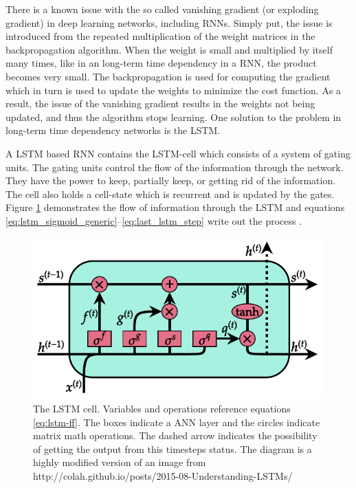 \documentclass[../main.tex]{subfiles}
\begin{document}
There is a known issue with the so called vanishing gradient (or exploding gradient) in deep learning networks, including \acp{RNN}.
Simply put, the issue is introduced from the repeated multiplication of the weight matrices in the backpropagation algorithm.
When the weight is small and multiplied by itself many times, like in an long-term time dependency in a \ac{RNN}, the product becomes very small.
The backpropagation is used for computing the gradient which in turn is used to update the weights to minimize the cost function.
As a result, the issue of the vanishing gradient results in the weights not being updated, and thus the algorithm stops learning.
One solution to the problem in long-term time dependency networks is the \ac{LSTM}.

A \ac{LSTM} based \ac{RNN} contains the \ac{LSTM}-cell which consists of a system of gating units.
The gating units control the flow of the information through the network.
They have the power to keep, partially keep, or getting rid of the information.
The cell also holds a cell-state which is recurrent and is updated by the gates.
Figure \ref{fig:lstm-cell} demonstrates the flow of information through the \ac{LSTM} and equations \ref{eq:lstm_sigmoid_generic}--\ref{eq:last_lstm_step} write out the process \cite{Goodfellow2016}.
\begin{figure}[ht!]
    \centering
    \includegraphics{img/LSTM-cell.pdf}
    \caption{The \ac{LSTM} cell. Variables and operations reference equations \ref{eq:lstm-ff}. The boxes indicate a \ac{ANN} layer and the circles indicate matrix math operations. The dashed arrow indicates the possibility of getting the output from this timesteps status. The diagram is a highly modified version of an image from http://colah.github.io/posts/2015-08-Understanding-LSTMs/}
    \label{fig:lstm-cell}
\end{figure}
\end{document}
